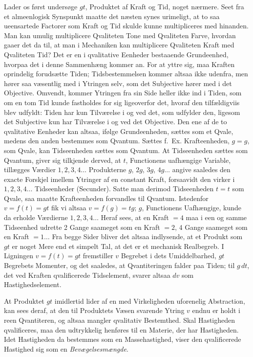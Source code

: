 \documentclass[12pt]{book}
\newcommand{\opage}[1]{\marginnote{\footnotesize\textit{[#1]}}}
\begin{document}
Lader os først undersøge $gt$, Produktet af Kraft og Tid, noget nærmere. Seet fra et
almeenlogisk Synspunkt maatte det næsten synes urimeligt, at to saa ueensartede Factorer
som Kraft og Tid skulde kunne multipliceres med hinanden. Man kan umulig multiplicere
Qvaliteten Tone med Qvaliteten Farve, hvordan gaaer det da til, at man i Mechaniken kan
multiplicere Qvaliteten Kraft med Qvaliteten Tid? Det er en i qvalitative Eenheder
bestaaende Grundeenhed, hvorpaa det i denne Sammenhæng kommer an. For at yttre sig, maa
Kraften oprindelig forudsætte Tiden; Tidsbestemmelsen kommer altsaa ikke udenfra, men
hører saa væsentlig med i Ytringen selv, som det Subjective hører med i det Objective.
Omvendt, kommer Ytringen fra sin Side heller ikke ind i Tiden, som om en tom Tid kunde
fastholdes for sig ligeoverfor det, hvoraf den tilfældigviis blev udfyldt: Tiden har kun
Tilværelse i og ved det, som udfylder den, ligesom det Subjective kun har Tilværelse i og
ved det Objective. Den ene
\opage{351} af de to qvalitative Eenheder kan altsaa, ifølge Grundeenheden, sættes som et Qvale,
medens den anden bestemmes som Qvantum. Sættes f.\ Ex. Krafteenheden, $g = g$, som Qvale,
kan Tidseenheden sættes som Qvantum. At Tidseenheden sættes som Qvantum, giver sig
tilkjende derved, at $t$, Functionens uafhængige Variable, tillægges Værdier
$1, 2, 3, 4\ldots$ Produkterne $g$, $2g$, $3g$, $4g\ldots$ angive saaledes den exacte
Forskjel imellem Ytringer af en constant Kraft, forsaavidt den virker i $1, 2, 3, 4\ldots$
Tidseenheder (Secunder). Satte man derimod Tidseenheden $t = t$ som Qvale, saa maatte
Krafteenheden forvandles til Qvantum. Istedenfor $v = f(t) = gt$ fik vi altsaa
$v = f(g) = tg$; $g$, Functionens Uafhængige, kunde da erholde Værdierne
$1, 2, 3, 4\ldots$ Heraf sees, at en Kraft $= 4$ maa i een og samme Tidseenhed udrette 2
Gange saameget som en Kraft $= 2$, 4 Gange saameget som en Kraft $= 1\ldots$ Fra begge
Sider bliver det altsaa indlysende, at et Produkt som $gt$ er noget Mere end et simpelt
Tal, at det er et mechanisk Realbegreb. I Ligningen $v = f(t) = gt$ fremstiller $v$
Begrebet i dets Umiddelbarhed, $gt$ Begrebets Momenter, og det saaledes, at Qvantiteringen
falder paa Tiden; til $g\,dt$, det ved Kraften qvalificerede Tidselement, svarer altsaa
$dv$ som Hastighedselement.

At Produktet $gt$ imidlertid lider af en med Virkeligheden uforenelig Abstraction, kan sees
deraf, at den til Produktets Væsen svarende Ytring $v$ endnu er holdt i reen Qvantiteren,
og altsaa mangler qvalitativ Bestemthed. Skal Hastigheden qvalificeres, maa den udtrykkelig
henføres til en Materie, der har Hastigheden. Idet Hastigheden da bestemmes som en
Massehastighed, viser den qvalificerede Hastighed sig som en \emph{Bevægelsesmængde}.
\end{document}
